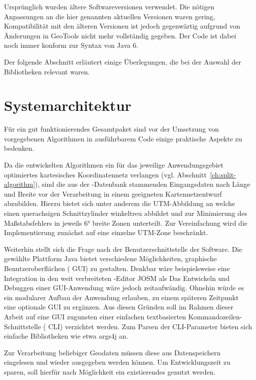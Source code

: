 \documentclass[../main/thesis.tex]{subfiles}
\begin{document}
Ursprünglich wurden ältere Softwareversionen verwendet.
Die nötigen Anpassungen an die hier genannten aktuellen Versionen waren gering, Kompatibilität mit den älteren Versionen ist jedoch gegenwärtig aufgrund von Änderungen in GeoTools nicht mehr vollständig gegeben.
Der Code ist dabei noch immer konform zur Syntax von Java 6. 

Der folgende Abschnitt erläutert einige Überlegungen, die bei der Auswahl der Bibliotheken relevant waren.



\section{Systemarchitektur}
\label{ch:impl-architecture}

Für ein gut funktionierendes Gesamtpaket sind vor der Umsetzung von vorgegebenen Algorithmen in ausführbarem Code einige praktische Aspekte zu bedenken.

Da die entwickelten Algorithmen ein für das jeweilige Anwendungsgebiet optimiertes kartesisches Koordinatennetz verlangen (vgl. Abschnitt~\ref{ch:split-algorithm}), sind die aus der \osm-Datenbank stammenden Eingangsdaten nach Länge und Breite vor der Verarbeitung in einem geeigneten Kartennetzentwurf abzubilden.
Hierzu bietet sich unter anderem die UTM-Abbildung an  welche einen querachsigen Schnittzylinder winkeltreu abbildet und zur Minimierung des Maßstabsfehlers in jeweils 6° breite Zonen unterteilt. 
Zur Vereinfachung wird die Implementierung zunächst auf eine einzelne UTM-Zone beschränkt.

Weiterhin stellt sich die Frage nach der Benutzerschnittstelle der Software.
Die gewählte Plattform Java bietet verschiedene Möglichkeiten, graphische Benutzeroberflächen ( GUI) zu gestalten.
Denkbar wäre beispielsweise eine Integration in den weit verbreiteten \osm-Editor JOSM als 
Das Entwickeln und Debuggen einer GUI-Anwendung wäre jedoch zeitaufwändig.
Ohnehin würde es ein modularer Aufbau der Anwendung erlauben, zu einem späteren Zeitpunkt eine optionale GUI zu ergänzen.
Aus diesen Gründen soll im Rahmen dieser Arbeit auf eine GUI zugunsten einer einfachen textbasierten Kommandozeilen-Schnittstelle ( CLI) verzichtet werden.
Zum Parsen der CLI-Parameter bieten sich einfache Bibliotheken wie etwa args4j an.

Zur Verarbeitung beliebiger Geodaten müssen diese aus Datenspeichern eingelesen und wieder ausgegeben werden können.
Um Entwicklungszeit zu sparen, soll hierfür nach Möglichkeit ein existierendes  genutzt werden.
\end{document}
